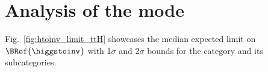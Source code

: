 



\section{Analysis of the \texorpdfstring{\ttH}{ttH} mode}
\label{sec:htoinv_analysis_ttH}


Fig.~\ref{fig:htoinv_limit_ttH} showcases the median expected limit on $\BRof{\higgstoinv}$ with 1$\sigma$ and 2$\sigma$ bounds for the \ttH category and its subcategories.

